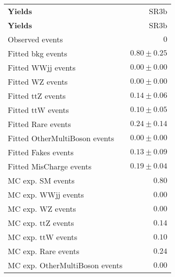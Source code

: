 \begin{table}
\begin{center}
\setlength{\tabcolsep}{0.0pc}
{\small
\begin{tabular*}{\textwidth}{@{\extracolsep{\fill}}lr}
\noalign{\smallskip}\hline\noalign{\smallskip}
{\bf Yields}           & SR3b              \\[-0.05cm]
\noalign{\smallskip}\hline\noalign{\smallskip}
{\bf Yields}           & SR3b              \\[-0.05cm]
\noalign{\smallskip}\hline\noalign{\smallskip}
Observed events          & $0$                    \\
\noalign{\smallskip}\hline\noalign{\smallskip}
Fitted bkg events         & $0.80 \pm 0.25$              \\
\noalign{\smallskip}\hline\noalign{\smallskip}
        Fitted WWjj events         & $0.00 \pm 0.00$              \\
        Fitted WZ events         & $0.00 \pm 0.00$              \\
        Fitted ttZ events         & $0.14 \pm 0.06$              \\
        Fitted ttW events         & $0.10 \pm 0.05$              \\
        Fitted Rare events         & $0.24 \pm 0.14$              \\
        Fitted OtherMultiBoson events         & $0.00 \pm 0.00$              \\
        Fitted Fakes events         & $0.13 \pm 0.09$              \\
        Fitted MisCharge events         & $0.19 \pm 0.04$              \\
 \noalign{\smallskip}\hline\noalign{\smallskip}
MC exp. SM events              & $0.80$              \\
\noalign{\smallskip}\hline\noalign{\smallskip}
        MC exp. WWjj events         & $0.00$              \\
        MC exp. WZ events         & $0.00$              \\
        MC exp. ttZ events         & $0.14$              \\
        MC exp. ttW events         & $0.10$              \\
        MC exp. Rare events         & $0.24$              \\
        MC exp. OtherMultiBoson events         & $0.00$              \\

\end{tabular*}}
\end{center}
\end{table}
